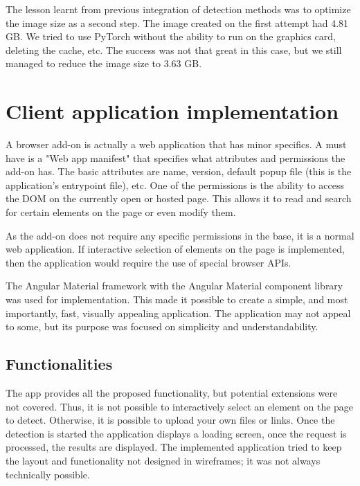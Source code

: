The lesson learnt from previous integration of detection methods was to optimize the image size as a second step. The image created on the first attempt had 4.81 GB. We tried to use PyTorch without the ability to run on the graphics card, deleting the cache, etc. The success was not that great in this case, but we still managed to reduce the image size to 3.63 GB.

\chapter{Client application implementation}

A browser add-on is actually a web application that has minor specifics. A must have is a "Web app manifest" that specifies what attributes and permissions the add-on has. The basic attributes are name, version, default popup file (this is the application's entrypoint file), etc. One of the permissions is the ability to access the DOM on the currently open or hosted page. This allows it to read and search for certain elements on the page or even modify them.

As the add-on does not require any specific permissions in the base, it is a normal web application. If interactive selection of elements on the page is implemented, then the application would require the use of special browser APIs.

The Angular Material framework with the Angular Material component library was used for implementation. This made it possible to create a simple, and most importantly, fast, visually appealing application. The application may not appeal to some, but its purpose was focused on simplicity and understandability. 

\section{Functionalities}

The app provides all the proposed functionality, but potential extensions were not covered. Thus, it is not possible to interactively select an element on the page to detect. Otherwise, it is possible to upload your own files or links. Once the detection is started the application displays a loading screen, once the request is processed, the results are displayed. The implemented application tried to keep the layout and functionality not designed in wireframes; it was not always technically possible. 

